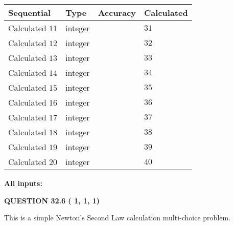 \documentclass[12pt]{article}
\begin{document}
  
\noindent\begin{tabular}{|l|l|l|l|}
\hline
 Sequential & Type & Accuracy & Calculated \\ 
\hline
 
 
  Calculated $          11$ & integer &  & 
  $ 31 $ 
 \\  \hline  
 
 
  Calculated $          12$ & integer &  & 
  $ 32 $ 
 \\  \hline  
 
 
  Calculated $          13$ & integer &  & 
  $ 33 $ 
 \\  \hline  
 
 
  Calculated $          14$ & integer &  & 
  $ 34 $ 
 \\  \hline  
 
 
  Calculated $          15$ & integer &  & 
  $ 35 $ 
 \\  \hline  
 
 
  Calculated $          16$ & integer &  & 
  $ 36 $ 
 \\  \hline  
 
 
  Calculated $          17$ & integer &  & 
  $ 37 $ 
 \\  \hline  
 
 
  Calculated $          18$ & integer &  & 
  $ 38 $ 
 \\  \hline  
 
 
  Calculated $          19$ & integer &  & 
  $ 39 $ 
 \\  \hline  
 
 
  Calculated $          20$ & integer &  & 
  $ 40 $ 
 \\  \hline  
 \end{tabular}
   
   
   
   
\noindent\vspace{0.1in}\hspace{-0.08in} {\textbf{\Large{All inputs: }}}
   
   
  
\vspace{0.2in}
  
{\textbf{\Large{QUESTION
32.6 
 (          1,          1,          1)
}}}
  
  


\noindent{}
This is a simple Newton's Second Law calculation multi-choice problem.  
\noindent{}
\end{document}
